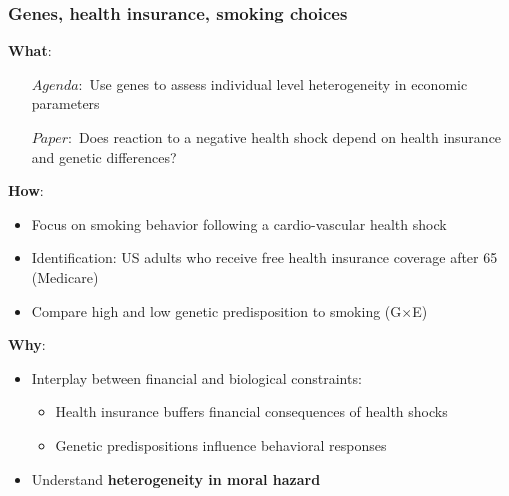 \documentclass[10pt,compress,xcolor=dvipsnames,aspectratio=169]{beamer}    %
\newcounter{ex}
\newcommand{\1}[1]{\mathrm{1\hspace*{-2.5pt}l}[#1]}	%
\begin{document}
\begin{frame}
\frametitle{Genes, health insurance, smoking choices}

\textbf{What}:
	\begin{itemize}
		\item[$Agenda:$] Use genes to assess individual level heterogeneity in economic parameters
		\item[$Paper:$] Does reaction to a negative health shock depend on health insurance and genetic differences?
	\end{itemize}

  \vspace{2ex}
  \pause

\textbf{How}:
\begin{itemize}
  \item Focus on smoking behavior following a cardio-vascular health shock
  \item Identification: US adults who receive free health insurance coverage after 65 (Medicare)
  \item Compare high and low genetic predisposition to smoking (G$\times$E)
\end{itemize}

  \vspace{2ex}
  \pause

\textbf{Why}:
\begin{itemize}
		\item Interplay between financial and biological constraints:
		\begin{itemize}
			\item Health insurance buffers financial consequences of health shocks
			\item Genetic predispositions influence behavioral responses
		\end{itemize}
			\item Understand \textbf{heterogeneity in moral hazard}
\end{itemize}
\end{frame}
\end{document}
